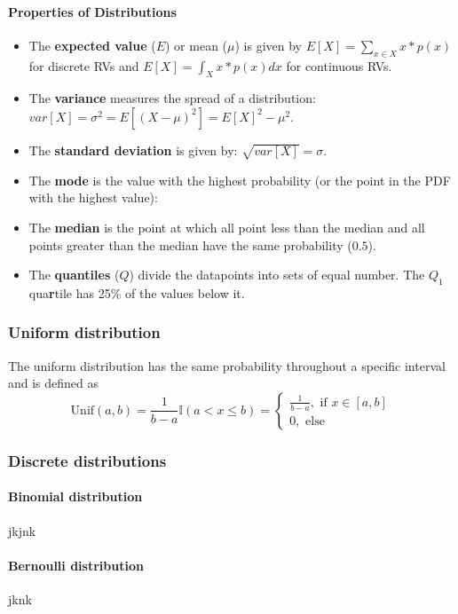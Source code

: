\documentclass[../main.tex]{subfiles}
\begin{document}
\paragraph{Properties of Distributions} 
\begin{itemize}
    \item[] The \textbf{expected value}  ($E$) or mean ($\mu$) is given by $E[X] = \sum_{x \in X} x*p(x)$ for discrete RVs and $E[X] = \int_X x*p(x) dx$ for continuous RVs.
    \item[] The \textbf{variance}  measures the spread of a distribution: $var[X] = \sigma^2 = E[(X-\mu)^2] = E[X]^2 - \mu^2$.
    \item[] The \textbf{standard deviation}  is given by: $\sqrt{var[X]} = \sigma$.
    \item[] The \textbf{mode}  is the value with the highest probability (or the point in the PDF with the highest value): 
    \item[] The \textbf{median}  is the point at which all point less than the median and all points greater than the median have the same probability ($0.5$). 
    \item[] The \textbf{quantiles} ($Q$)  divide the datapoints into sets of equal number. The $Q_1$ qua\textbf{r}tile has 25\% of the values below it. 
\end{itemize}

\subsubsection{Uniform distribution} 
        The uniform distribution has the same probability throughout a specific interval and is defined as 
        \[ \text{Unif}(a,b) = \frac{1}{b-a} \mathbb{I}(a < x \leq b) = \begin{cases} 
            \frac{1}{b-a}, \text{ if } x \in [ a,b ] \\
            0, \text{ else}
        \end{cases}
        \]

\subsubsection{Discrete distributions}
\paragraph{Binomial distribution}  jkjnk %
\paragraph{Bernoulli distribution}  jknk %
\end{document}
